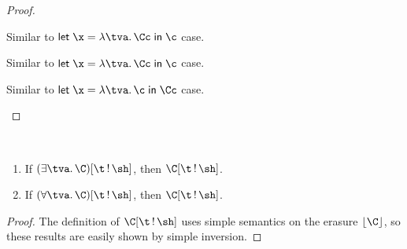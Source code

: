 \documentclass[acmsmall,screen,nonacm%
\Anonymous{,anonymous}{}%
\Final{}{,review}%
]{acmart}
\begin{document}
\begin{lemma}
\begin{proof}
\begin{proofcases}
      \proofcase{$\clet \x \tv \Cc \c$}

	\begin{llproof}
\Hand 	  {}
	\end{llproof}

      \proofcase{$\clet \x \tv \c \Cc$}

	\begin{llproof}
	  Similar to $\clet \x \tv \Cc \c$ case.
	\end{llproof}

      \proofcase{$\cletr \x \tv \tvs \Cc \c$}

	\begin{llproof}
	  Similar to $\clet \x \tv \Cc \c$ case.
	\end{llproof}

      \proofcase{$\cletr \x \tv \tvs \c \Cc$}

	\begin{llproof}
	  Similar to $\clet \x \tv \c \Cc$ case.
	\end{llproof}
    \end{proofcases}
  \end{proof}
\end{lemma}

\begin{lemma}
  \label{lem:unicity-inversion}~
  \begin{enumerate}[(\roman*)]
    \item If $\Cshape {\parens{\cexists \tv \C}} \t \sh$, then $\Cshape \C \t \sh$.
    \item If $\Cshape {\parens{\cfor \tv \C}} \t \sh$, then $\Cshape \C \t \sh$.
  \end{enumerate}
  \begin{proof}
    The definition of $\Cshape \C \t \sh$ uses simple semantics on the
    erasure $\cerase \C$, so these results are easily shown by simple inversion.
  \end{proof}
\end{lemma}
\end{document}
